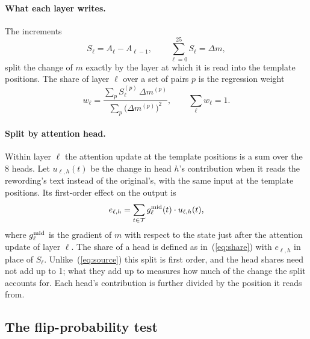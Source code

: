 \documentclass[11pt]{article}
\newcommand{\cT}{\mathcal{T}}
\newcommand{\Dm}{\Delta m}
\begin{document}
\paragraph{What each layer writes.} The increments
\begin{equation}
S_\ell=A_\ell-A_{\ell-1},\qquad \sum_{\ell=0}^{25}S_\ell=\Dm ,
\label{eq:source}
\end{equation}
split the change of $m$ exactly by the layer at which it is read into the template positions. The share of layer $\ell$ over a set of pairs $p$ is the regression weight
\begin{equation}
w_\ell=\frac{\sum_p S_\ell^{(p)}\,\Dm^{(p)}}{\sum_p \bigl(\Dm^{(p)}\bigr)^2},\qquad \sum_\ell w_\ell=1 .
\label{eq:share}
\end{equation}

\paragraph{Split by attention head.} Within layer $\ell$ the attention update at the template positions is a sum over the 8 heads. Let $u_{\ell,h}(t)$ be the change in head $h$'s contribution when it reads the rewording's text instead of the original's, with the same input at the template positions. Its first-order effect on the output is
\begin{equation}
e_{\ell,h}=\sum_{t\in\cT} g^{\rm mid}_\ell(t)\cdot u_{\ell,h}(t),
\label{eq:head}
\end{equation}
where $g^{\rm mid}_\ell$ is the gradient of $m$ with respect to the state just after the attention update of layer $\ell$. The share of a head is defined as in~(\ref{eq:share}) with $e_{\ell,h}$ in place of $S_\ell$. Unlike~(\ref{eq:source}) this split is first order, and the head shares need not add up to 1; what they add up to measures how much of the change the split accounts for. Each head's contribution is further divided by the position it reads from.

\subsection{The flip-probability test}
\label{sec:testdef}
\end{document}

